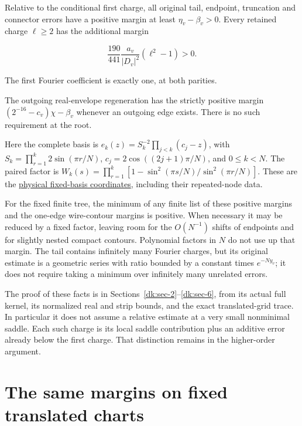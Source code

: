 Relative to the conditional first charge, all original tail, endpoint, truncation and connector errors have a positive margin at least \(\eta_v-\beta_v>0\). Every retained charge \(\ell\ge2\) has the additional margin

\begin{equation}\label{dao:eq-8}
\frac{190}{441}\frac{a_v}{|D_v|^2}(\ell^2-1)>0.
\end{equation}

The first Fourier coefficient is exactly one, at both parities.

The outgoing real-envelope regeneration has the strictly positive margin \((2^{-16}-c_v)\chi-\beta_v\) whenever an outgoing edge exists. There is no such requirement at the root.

Here the complete basis is \(e_k(z)=S_k^{-2}\prod_{j<k}(c_j-z)\), with \(S_k=\prod_{r=1}^{k}2\sin(\pi r/N)\), \(c_j=2\cos((2j+1)\pi/N)\), and \(0\le k<N\). The paired factor is \(W_k(s)=\prod_{r=1}^{k}[1-\sin^2(\pi s/N)/\sin^2(\pi r/N)]\). These are the \href{https://sashakolpakov.github.io/murakamis_dream/notes/actual_main_meridian_turn_comparison.html}{physical fixed-basis coordinates}, including their repeated-node data.

For the fixed finite tree, the minimum of any finite list of these positive margins and the one-edge wire-contour margins is positive. When necessary it may be reduced by a fixed factor, leaving room for the \(O(N^{-1})\) shifts of endpoints and for slightly nested compact contours. Polynomial factors in \(N\) do not use up that margin. The tail contains infinitely many Fourier charges, but its original estimate is a geometric series with ratio bounded by a constant times \(e^{-Ny_v}\); it does not require taking a minimum over infinitely many unrelated errors.

The proof of these facts is in Sections~\ref{dk:sec-2}--\ref{dk:sec-6}, from its actual full kernel, its normalized real and strip bounds, and the exact translated-grid trace. In particular it does not assume a relative estimate at a very small nonminimal saddle. Each such charge is its local saddle contribution plus an additive error already below the first charge. That distinction remains in the higher-order argument.

\section{The same margins on fixed translated charts}\label{dao:sec-3}

